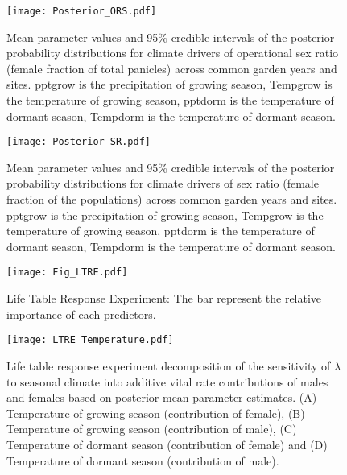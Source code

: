 \documentclass[9pt,twoside,lineno]{pnas-new}
\begin{document}
\begin{figure}
\centering
\texttt{[image: Posterior\_ORS.pdf]}
\caption{Mean parameter values and 95\% credible intervals of the posterior probability distributions for climate drivers of operational sex ratio (female fraction of total panicles) across common garden years and sites. 
		pptgrow is  the precipitation of growing season,
		Tempgrow is the temperature of growing season,
		pptdorm is the temperature of dormant season,
		Tempdorm is the temperature of dormant season.}
\label{Sup:posterior_OSR}
\end{figure}
\clearpage

\begin{figure}
\centering
\texttt{[image: Posterior\_SR.pdf]}
\caption{Mean parameter values and 95\% credible intervals of the posterior probability distributions for climate drivers of sex ratio (female fraction of the populations) across common garden years and sites. 
			pptgrow is  the precipitation of growing season,
			Tempgrow is the temperature of growing season,
			pptdorm is the temperature of dormant season,
			Tempdorm is the temperature of dormant season.}
\label{Sup:posterior_SR}
\end{figure}
\clearpage


\begin{figure}
\centering
\texttt{[image: Fig\_LTRE.pdf]}
\caption{Life Table Response Experiment: The bar represent the relative importance of each predictors.}
\label{Sup:LTRE}
\end{figure}
\clearpage

\begin{figure}
\centering
\texttt{[image: LTRE\_Temperature.pdf]}
\caption{Life table response experiment decomposition of the sensitivity of $\lambda$ to seasonal climate into additive vital rate contributions of males and females based on posterior mean parameter estimates.
			(A) Temperature of growing season (contribution of female), (B) Temperature of growing season (contribution of male),  (C) Temperature of dormant season (contribution of female) and (D) Temperature of dormant season (contribution of male).}
		\label{Sup:LTRETemp}
\end{figure}
\clearpage
\end{document}
